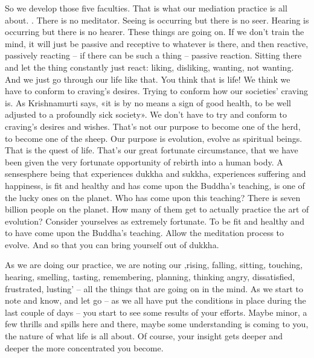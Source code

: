 \documentclass[letterpaper,10pt,english]{sphinxmanual}
\begin{document}
\sphinxAtStartPar
So we develop those five faculties. That is what our mediation practice
is all about.
. There is no meditator. Seeing is occurring but there is no
seer. Hearing is occurring but there is no hearer. These things are going on.
If we don’t train the mind, it will just be passive and receptive to whatever
is there, and then reactive, passively reacting – if there can be such a thing –
passive reaction. Sitting there and let the thing constantly just react: liking,
disliking, wanting, not wanting. And we just go through our life like that.
You  think  that  is  life!  We  think  we  have  to  conform  to  craving’s  desires.
Trying to conform how our societies’ craving is. As Krishnamurti says, «it is
by no means a sign of good health, to be well adjusted to a profoundly sick
  society». We don’t have to try and conform to craving’s desires and wishes.
That’s  not  our  purpose  to  become  one  of  the  herd,  to  become  one  of  the
sheep. Our purpose is evolution, evolve as spiritual beings. That is the quest
of  life.  That’s  our  great  fortunate  circumstance,  that  we  have  been  given
the very fortunate opportunity of rebirth into a human body. A sense\sphinxhyphen{}sphere
being that experiences dukkha and sukkha, experiences suffering and happiness, is fit and healthy and has come upon the Buddha’s teaching, is one
of the lucky ones on the planet. Who has come upon this teaching? There
is  seven  billion  people  on  the  planet.  How  many  of  them  get  to  actually
practice  the  art  of  evolution?  Consider  yourselves  as  extremely  fortunate.
To be fit and healthy and to have come upon the Buddha’s teaching. Allow
the meditation process to evolve. And so that you can bring yourself out of
dukkha.

\sphinxAtStartPar
As  we  are  doing  our  practice,  we  are  noting  our  ‚rising,  falling,  sitting, touching, hearing, smelling, tasting, remembering, planning, thinking
angry, dissatisfied, frustrated, lusting’ – all the things that are going on in
the mind. As we start to note and know, and let go – as we all have put the
conditions  in  place  during  the  last  couple  of  days  –  you  start  to  see  some
results of your efforts. Maybe minor, a few thrills and spills here and there,
maybe some understanding is coming to you, the nature of what life is all
about. Of course, your insight gets deeper and deeper the more concentrated
you become.
\end{document}
